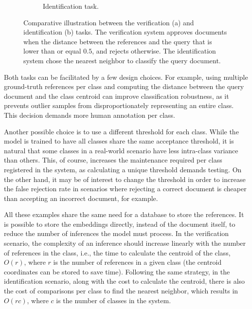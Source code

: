 \begin{figure}[ht!]
\begin{subfigure}[b]{0.62\textwidth}
        \caption{Identification task.}
        \label{fig:identification_example}
    \end{subfigure}
    \caption{Comparative illustration between the verification (a) and identification (b) tasks. The verification system approves documents when the distance between the references and the query that is lower than or equal $0.5$, and rejects otherwise. The identification system chose the nearest neighbor to classify the query document.}
    \label{fig:ver_ind}
\end{figure}

Both tasks can be facilitated by a few design choices. For example, using multiple ground-truth references per class and computing the distance between the query document and the class centroid can improve classification robustness, as it prevents outlier samples from disproportionately representing an entire class. This decision demands more human annotation per class.

Another possible choice is to use a different threshold for each class. While the model is trained to have all classes share the same acceptance threshold, it is natural that some classes in a real-world scenario have less intra-class variance than others. This, of course, increases the maintenance required per class registered in the system, as calculating a unique threshold demands testing. On the other hand, it may be of interest to change the threshold in order to increase the false rejection rate in scenarios where rejecting a correct document is cheaper than accepting an incorrect document, for example.

All these examples share the same need for a database to store the references. It is possible to store the embeddings directly, instead of the document itself, to reduce the number of inferences the model must process. In the verification scenario, the complexity of an inference should increase linearly with the number of references in the class, i.e., the time to calculate the centroid of the class, $O(r)$, where $r$ is the number of references in a given class (the centroid coordinates can be stored to save time). Following the same strategy, in the identification scenario, along with the cost to calculate the centroid, there is also the cost of comparisons per class to find the nearest neighbor, which results in $O(rc)$, where $c$ is the number of classes in the system.


